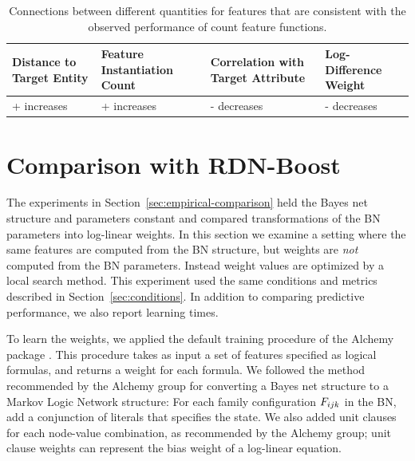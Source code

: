 \documentclass[runningheads,a4paper]{llncs}
\begin{document}
\begin{table}[htdp]
\caption{Connections between different quantities for features that are consistent with the observed performance of count feature functions. 
}
\begin{center}
\begin{tabular}{|p{3cm}|p{3cm}p{3cm}p{3cm}|}
Distance to Target Entity & Feature Instantiation Count & Correlation with Target Attribute & Log-Difference Weight \\\hline
+ increases & + increases & - decreases & - decreases
\end{tabular}
\end{center}
\label{table:heuristic}
\end{table}%




\section{Comparison with RDN-Boost}
\label{sec:general-weights}

The experiments in Section~\ref{sec:empirical-comparison} held the Bayes net structure and parameters constant and compared transformations of the BN parameters into log-linear weights. In this section we examine a setting where the same features are computed from the BN structure, but weights are {\em not} computed from the BN parameters. Instead weight values are optimized by a local search method. This experiment used the same conditions and metrics described in Section~\ref{sec:conditions}.  In addition to comparing predictive performance, we also report learning times.

To learn the weights, we applied the default training procedure of the Alchemy package \cite{Kok2009a}.  This procedure takes as input a set of features specified as logical formulas, and returns a weight for each formula. We followed the method recommended by the Alchemy group \cite{bib:bayes-convert} for converting a Bayes net structure to a Markov Logic Network structure: For each family configuration $F_{ijk}$ in the BN, add a conjunction of literals that specifies the state. We also added unit clauses for each node-value combination, as recommended by the Alchemy group; unit clause weights can represent the bias weight of a log-linear equation.
\end{document}
